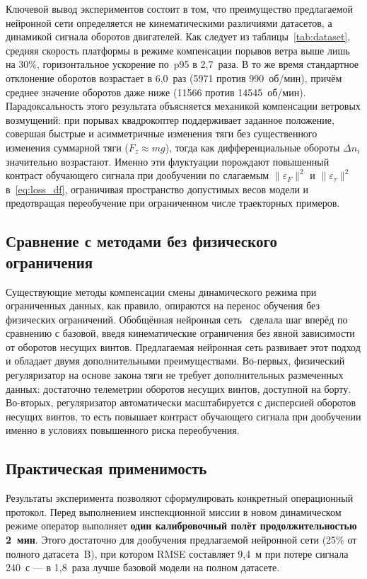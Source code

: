 Ключевой вывод экспериментов состоит в том, что преимущество предлагаемой
нейронной сети определяется не кинематическими различиями датасетов,
а динамикой сигнала оборотов двигателей.
Как следует из таблицы~\ref{tab:dataset}, средняя скорость платформы в режиме
компенсации порывов ветра выше лишь на 30\%, горизонтальное ускорение по~p95
в 2{,}7~раза.
В то же время стандартное отклонение оборотов возрастает в 6{,}0~раз
(5971 против 990~об/мин), причём среднее значение оборотов даже ниже
(11566 против 14545~об/мин).
Парадоксальность этого результата объясняется механикой компенсации ветровых
возмущений: при порывах квадрокоптер поддерживает заданное положение, совершая
быстрые и асимметричные изменения тяги без существенного изменения суммарной
тяги ($F_z \approx mg$), тогда как дифференциальные обороты $\Delta n_i$
значительно возрастают.
Именно эти флуктуации порождают повышенный контраст обучающего сигнала при
дообучении по слагаемым $\|\varepsilon_F\|^2$ и $\|\varepsilon_\tau\|^2$
в~\eqref{eq:loss_df}, ограничивая пространство допустимых весов модели и
предотвращая переобучение при ограниченном числе траекторных примеров.

\subsection{Сравнение с методами без физического ограничения}

Существующие методы компенсации смены динамического режима при ограниченных
данных, как правило, опираются на перенос обучения без физических
ограничений.
Обобщённая нейронная сеть~\cite{Sidorenko2026} сделала шаг вперёд по сравнению
с базовой, введя кинематические ограничения без явной зависимости от оборотов
несущих винтов.
Предлагаемая нейронная сеть развивает этот подход и обладает двумя
дополнительными преимуществами.
Во-первых, физический регуляризатор на основе закона тяги не требует
дополнительных размеченных данных: достаточно телеметрии оборотов несущих
винтов, доступной на борту.
Во-вторых, регуляризатор автоматически масштабируется с дисперсией оборотов
несущих винтов, то есть повышает контраст обучающего сигнала при дообучении
именно в условиях повышенного риска переобучения.

\subsection{Практическая применимость}

Результаты эксперимента позволяют сформулировать конкретный операционный
протокол.
Перед выполнением инспекционной миссии в новом динамическом режиме оператор
выполняет \textbf{один калибровочный полёт продолжительностью 2~мин}.
Этого достаточно для дообучения предлагаемой нейронной сети (25\% от полного
датасета~B), при котором RMSE составляет 9{,}4~м при потере сигнала 240~с ---
в 1{,}8~раза лучше базовой модели на полном датасете.

